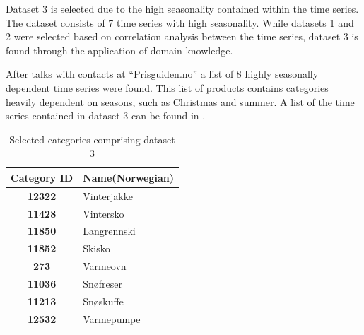 Dataset 3 is selected due to the high seasonality contained within the time series.
The dataset consists of 7 time series with high seasonality.
While datasets 1 and 2 were selected based on correlation analysis between the time series,
dataset 3 is found through the application of domain knowledge.

After talks with contacts at ``Prisguiden.no'' a list of 8 highly seasonally dependent time series were found.
This list of products contains categories heavily dependent on seasons, such as Christmas and summer.
A list of the time series contained in dataset 3 can be found in .


\begin{table}[H]
  \centering
  \caption{Selected categories comprising dataset 3}
  \label{table:dataset3}
  \begin{tabular}{|c|l|}\hline
    Category ID      & Name(Norwegian) \\ \hline
    \textbf{12322  } & Vinterjakke     \\ \hline
    \textbf{11428  } & Vintersko       \\ \hline
    \textbf{11850  } & Langrennski     \\ \hline
    \textbf{11852  } & Skisko          \\ \hline
    \textbf{273    } & Varmeovn        \\ \hline
    \textbf{11036  } & Snøfreser       \\ \hline
    \textbf{11213  } & Snøskuffe       \\ \hline
    \textbf{12532  } & Varmepumpe      \\ \hline
  \end{tabular}
\end{table}


